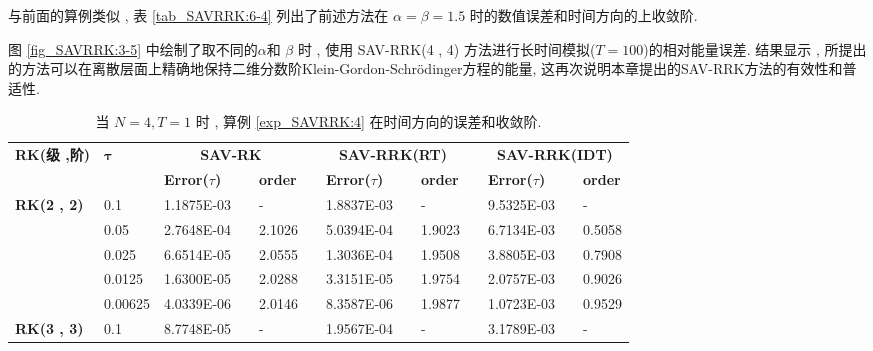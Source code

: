 与前面的算例类似 , 表 \ref{tab_SAVRRK:6-4} 列出了前述方法在 $\alpha=\beta=1.5$ 时的数值误差和时间方向的上收敛阶.

图 \ref{fig_SAVRRK:3-5} 中绘制了取不同的$\alpha$和 $\beta$ 时 , 使用 SAV-RRK(4 , 4) 方法进行长时间模拟($T=100$)的相对能量误差.
结果显示 , 所提出的方法可以在离散层面上精确地保持二维分数阶Klein-Gordon-Schr{\"o}dinger方程的能量, 这再次说明本章提出的SAV-RRK方法的有效性和普适性.

\begin{table}[H]\scriptsize
\centering
\caption{当 $N=4 , T = 1$ 时 , 算例 \ref{exp_SAVRRK:4}  在时间方向的误差和收敛阶.}
\begin{tabular}{lllllrlrlrlrlrl}
\toprule
\multicolumn{2}{l}{\multirow{2}[3]{*}{\textbf{RK(级 ,阶)}}} & \multicolumn{2}{l}{\multirow{2}[3]{*}{$\bm{\tau}$}} & \multicolumn{3}{c}{\textbf{SAV-RK}} &       & \multicolumn{3}{c}{\textbf{SAV-RRK(RT)}} &       & \multicolumn{3}{c}{\textbf{SAV-RRK(IDT)}} \\
\cmidrule{5-7}\cmidrule{9-11}\cmidrule{13-15}    \multicolumn{2}{l}{} & \multicolumn{2}{l}{} & \textbf{Error($\tau$)} &       & \textbf{order} &       & \textbf{Error($\tau$)} &       & \textbf{order} &       & \textbf{Error($\tau$)} &       & \textbf{order} \\
\hline
\multicolumn{2}{l}{\multirow{5}[0]{*}{\textbf{RK(2 , 2)}}} & \multicolumn{2}{l}{0.1} & 1.1875E-03 &       & -     &       & 1.8837E-03 &       & -     &       & 9.5325E-03 &       & - \\
\multicolumn{2}{l}{} & \multicolumn{2}{l}{0.05} & 2.7648E-04 &       & 2.1026  &       & 5.0394E-04 &       & 1.9023  &       & 6.7134E-03 &       & 0.5058  \\
\multicolumn{2}{l}{} & \multicolumn{2}{l}{0.025} & 6.6514E-05 &       & 2.0555  &       & 1.3036E-04 &       & 1.9508  &       & 3.8805E-03 &       & 0.7908  \\
\multicolumn{2}{l}{} & \multicolumn{2}{l}{0.0125} & 1.6300E-05 &       & 2.0288  &       & 3.3151E-05 &       & 1.9754  &       & 2.0757E-03 &       & 0.9026  \\
\multicolumn{2}{l}{} & \multicolumn{2}{l}{0.00625} & 4.0339E-06 &       & 2.0146  &       & 8.3587E-06 &       & 1.9877  &       & 1.0723E-03 &       & 0.9529  \\
\multicolumn{2}{l}{\multirow{5}[0]{*}{\textbf{RK(3 , 3)}}} & \multicolumn{2}{l}{0.1} & 8.7748E-05 &       & -     &       & 1.9567E-04 &       & -     &       & 3.1789E-03 &       & - \\

\end{tabular}
\end{table}
